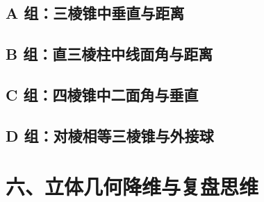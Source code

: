 \documentclass[11pt,a4paper]{ctexart}
\begin{document}
\subsection*{A 组：三棱锥中垂直与距离}

\freequestionheader
\qSolidPracticePyramidDistStem
\begin{center}
  \qSolidPracticePyramidDistFigure[1.6]
\end{center}

\newpage

\subsection*{B 组：直三棱柱中线面角与距离}

\freequestionheader
\qSolidPracticePrismAngleStem
\begin{center}
  \qSolidPracticePrismAngleFigure[1.6]
\end{center}

\newpage

\subsection*{C 组：四棱锥中二面角与垂直}

\freequestionheader
\qSolidPracticePyramidDihedralStem
\begin{center}
  \qSolidPracticePyramidDihedralFigure[1.6]
\end{center}

\newpage

\subsection*{D 组：对棱相等三棱锥与外接球}

\freequestionheader
\qSolidIsoscelesTetrahedronStem
\begin{center}
  \qSolidIsoscelesTetrahedronFigure[1.6]
\end{center}

\newpage

\section*{六、立体几何降维与复盘思维}
\end{document}
